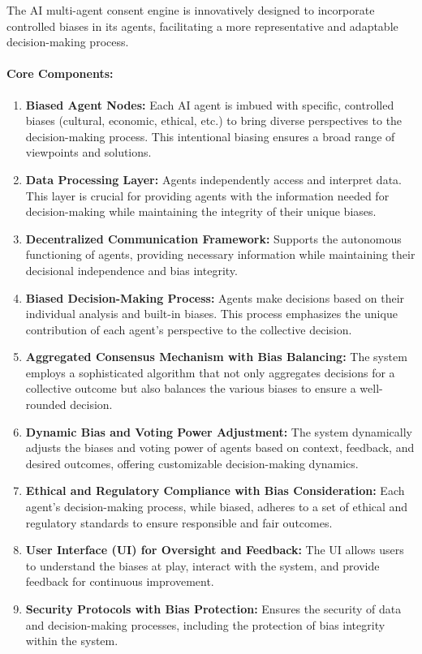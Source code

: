 The AI multi-agent consent engine is innovatively designed to
incorporate controlled biases in its agents, facilitating a more
representative and adaptable decision-making process.

\hypertarget{core-components}{%
\paragraph{Core Components:}\label{core-components}}

\begin{enumerate}
\def\labelenumi{\arabic{enumi}.}
\item
  \textbf{Biased Agent Nodes:} Each AI agent is imbued with specific,
  controlled biases (cultural, economic, ethical, etc.) to bring diverse
  perspectives to the decision-making process. This intentional biasing
  ensures a broad range of viewpoints and solutions.
\item
  \textbf{Data Processing Layer:} Agents independently access and
  interpret data. This layer is crucial for providing agents with the
  information needed for decision-making while maintaining the integrity
  of their unique biases.
\item
  \textbf{Decentralized Communication Framework:} Supports the
  autonomous functioning of agents, providing necessary information
  while maintaining their decisional independence and bias integrity.
\item
  \textbf{Biased Decision-Making Process:} Agents make decisions based
  on their individual analysis and built-in biases. This process
  emphasizes the unique contribution of each agent's perspective to the
  collective decision.
\item
  \textbf{Aggregated Consensus Mechanism with Bias Balancing:} The
  system employs a sophisticated algorithm that not only aggregates
  decisions for a collective outcome but also balances the various
  biases to ensure a well-rounded decision.
\item
  \textbf{Dynamic Bias and Voting Power Adjustment:} The system
  dynamically adjusts the biases and voting power of agents based on
  context, feedback, and desired outcomes, offering customizable
  decision-making dynamics.
\item
  \textbf{Ethical and Regulatory Compliance with Bias Consideration:}
  Each agent's decision-making process, while biased, adheres to a set
  of ethical and regulatory standards to ensure responsible and fair
  outcomes.
\item
  \textbf{User Interface (UI) for Oversight and Feedback:} The UI allows
  users to understand the biases at play, interact with the system, and
  provide feedback for continuous improvement.
\item
  \textbf{Security Protocols with Bias Protection:} Ensures the security
  of data and decision-making processes, including the protection of
  bias integrity within the system.
\end{enumerate}

